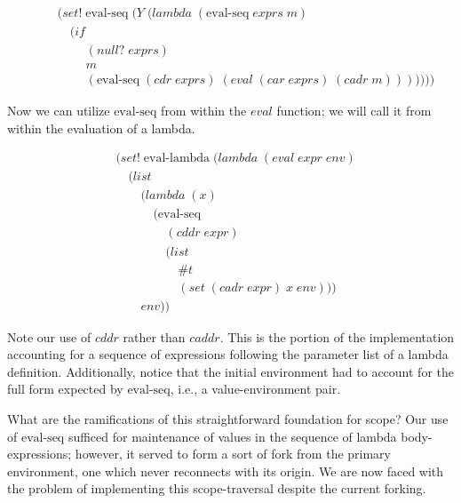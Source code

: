\begin{figure}[htp]
\caption{}\label{fig:evalSeqPrelude}
\begin{align*}
& (set! \; \text{eval-seq} \; (Y \; (lambda \; (\text{eval-seq} \; exprs \; m)
\\& \quad (if
\\& \qquad \; (null? \; exprs)
\\& \qquad \; m
\\& \qquad \; (\text{eval-seq} \; (cdr \; exprs) \; (eval \; (car \; exprs) \; (cadr \; m)))))))
\end{align*}
\end{figure}

Now we can utilize $\text{eval-seq}$ from within the $eval$ function; we will call
it from within the evaluation of a lambda.

\begin{figure}[htp]
\caption{}\label{fig:multiExprEvalLambda}
\begin{align*}
& (set! \; \text{eval-lambda} \; (lambda \; (eval \; expr \; env)
\\& \quad (list
\\& \qquad (lambda \; (x) \; 
\\& \qquad \quad (\text{eval-seq} \; 
\\& \qquad \qquad (cddr \; expr) \; 
\\& \qquad \qquad (list
\\& \qquad \qquad \quad \#t
\\& \qquad \qquad \quad (set \; (cadr \; expr) \; x \; env)))
\\& \qquad env))
\end{align*}
\end{figure}

Note our use of $cddr$ rather than $caddr$. This is the portion of the
implementation accounting for a sequence of expressions following the
parameter list of a lambda definition. Additionally, notice that the initial
environment had to account for the full form expected by $\text{eval-seq}$, i.e.,
a value-environment pair.

What are the ramifications of this straightforward foundation for scope? Our
use of $\text{eval-seq}$ sufficed for maintenance of values in the sequence of 
lambda body-expressions; however, it served to form a sort of fork from the
primary environment, one which never reconnects with its origin. We are now
faced with the problem of implementing this scope-traversal despite the
current forking.

